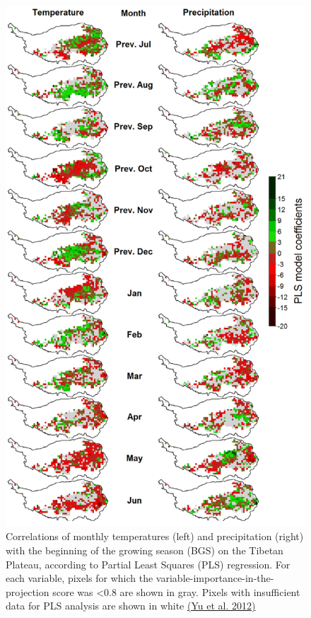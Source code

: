 \documentclass[
]{book}
\begin{document}
\begin{figure}
\centering
\includegraphics{pictures/PLS_Tibet_3.png}
\caption{Correlations of monthly temperatures (left) and precipitation (right) with the beginning of the growing season (BGS) on the Tibetan Plateau, according to Partial Least Squares (PLS) regression. For each variable, pixels for which the variable-importance-in-the-projection score was \textless0.8 are shown in gray. Pixels with insufficient data for PLS analysis are shown in white \href{https://journals.plos.org/plosone/article?id=10.1371/journal.pone.0049230}{(Yu et al. \protect\hyperlink{ref-yu2012seasonal}{2012})}}
\end{figure}
\end{document}
